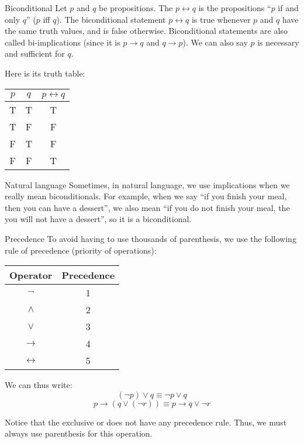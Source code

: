 \documentclass{article}
\begin{document}
\begin{parag}{Biconditional}
    Let $p$ and $q$ be propositions. The  $p \leftrightarrow q$ is the propositions ``$p$ if and only $q$'' ($p$ iff $q$). The biconditional statement $p \leftrightarrow q$ is true whenever $p$ and $q$ have the same truth values, and is false otherwise. Biconditional statements are also called bi-implications (since it is $p \to q$ and $q \to p$). We can also say $p$ is necessary and sufficient for $q$. 

    Here is its truth table:
    \begin{center}
    \begin{tabular}{c|c|c}
        $p$ & $q$ & $p \leftrightarrow q$ \\
        \hline
        T & T & T  \\
        T & F & F  \\
        F & T & F  \\
        F & F & T
    \end{tabular}
    \end{center}

    \begin{subparag}{Natural language}
        Sometimes, in natural language, we use implications when we really mean biconditionals. For example, when we say ``if you finish your meal, then you can have a dessert'', we also mean ``if you do not finish your meal, the you will not have a dessert'', so it is a biconditional.
    \end{subparag}
\end{parag}

\begin{parag}{Precedence}
    To avoid having to use thousands of parenthesis, we use the following rule of precedence (priority of operations):
    \begin{center}
    \begin{tabular}{|c|c|}
        \hline
        \textbf{Operator} & \textbf{Precedence}  \\
        \hline
        $\lnot$ & 1 \\
        \hline
        $\land$ & 2 \\
        \hline
        $\lor$ & 3  \\
        \hline
        $\to$ & 4 \\
        \hline
        $\leftrightarrow$ & 5 \\
        \hline
    \end{tabular}
    \end{center}


    We can thus write: 
    \[\left(\lnot p\right) \lor q \equiv \lnot p \lor q\]
    \[p \to \left(q \lor \left(\lnot r\right)\right) \equiv p \to q \lor \lnot r\]

    Notice that the exclusive or does not have any precedence rule. Thus, we must always use parenthesis for this operation.
\end{parag}
\end{document}
